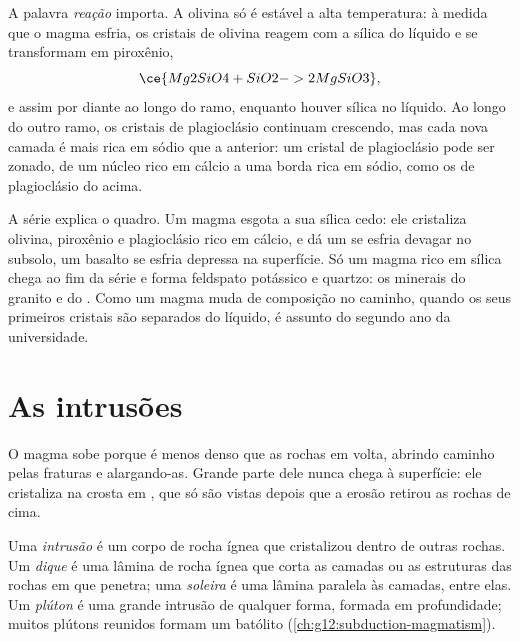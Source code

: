 A palavra \emph{reação} importa. A olivina só é estável a alta temperatura:
à medida que o magma esfria, os cristais de olivina reagem com a sílica do
líquido e se transformam em piroxênio,
\[
  \ce{Mg2SiO4 + SiO2 -> 2 MgSiO3},
\]
e assim por diante ao longo do ramo, enquanto houver sílica no líquido. Ao
longo do outro ramo, os cristais de plagioclásio continuam crescendo, mas
cada nova camada é mais rica em sódio que a anterior: um cristal de
plagioclásio pode ser zonado, de um núcleo rico em cálcio a uma borda rica
em sódio, como os  de plagioclásio do  acima.

A série explica o quadro. Um magma  esgota a sua sílica cedo: ele
cristaliza olivina, piroxênio e plagioclásio rico em cálcio, e dá um 
se esfria devagar no subsolo, um basalto se esfria depressa na superfície.
Só um magma rico em sílica chega ao fim da série e forma feldspato potássico
e quartzo: os minerais do granito e do . Como um magma muda de
composição no caminho, quando os seus primeiros cristais são separados do
líquido, é assunto do segundo ano da universidade.

\section{As intrusões}

O magma sobe porque é menos denso que as rochas em volta, abrindo caminho
pelas fraturas e alargando-as. Grande parte dele nunca chega à superfície:
ele cristaliza na crosta em , que só são vistas depois que a erosão
retirou as rochas de cima.

\begin{definition}\label{def:g11:igneous-rocks:intrusion}
Uma \emph{intrusão} é um corpo de rocha ígnea que
cristalizou dentro de outras rochas. Um \emph{dique} é uma
lâmina de rocha ígnea que corta as camadas ou as estruturas das rochas em
que penetra; uma \emph{soleira} é uma lâmina paralela às
camadas, entre elas. Um \emph{plúton} é uma grande
intrusão de qualquer forma, formada em profundidade; muitos plútons reunidos
formam um batólito (\cref{ch:g12:subduction-magmatism}).
\end{definition}

